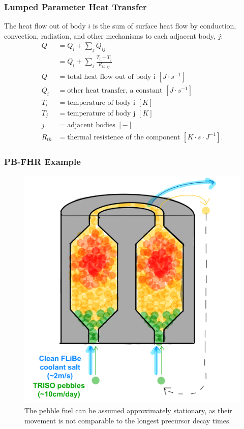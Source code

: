 \begin{frame}
        \frametitle{Lumped Parameter Heat Transfer}

The heat flow out of body $i$ is the sum of surface heat flow by conduction,
convection, radiation, and other mechanisms to each adjacent body, $j$:
\begin{align}
Q &= Q_i + \sum_j Q_{ij}\\
  &=Q_i +  \sum_j\frac{T_{i} - T_{j}}{R_{th,ij}}\\
\dot{Q} &= \mbox{total heat flow out of body i }[J\cdot s^{-1}]\\
Q_i &= \mbox{other heat transfer, a constant }[J\cdot s^{-1}]\\
T_i &= \mbox{temperature of body i }[K]\\
T_j &= \mbox{temperature of body j }[K]\\
j &= \mbox{adjacent bodies }[-]\\
R_{th} &= \mbox{thermal resistence of the component }[K \cdot s \cdot J^{-1}].
\end{align}
\end{frame}

\begin{frame}
        \frametitle{PB-FHR Example}

               \begin{figure}[t]
                \vspace*{-0.1in}
                       \includegraphics[height=0.5\textwidth]{./images/pbfhr-fuel-movement.png}
                       \caption{The pebble fuel can be assumed approximately 
                       stationary, as their movement is not comparable to the 
                       longest precursor decay times.}
               \end{figure}

\end{frame}


